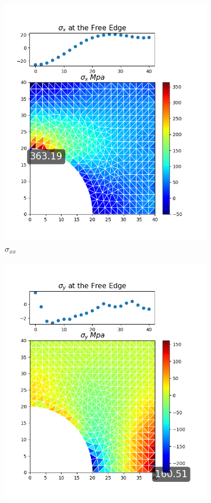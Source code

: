 \documentclass[twoside,twocolumn,10pt]{article}
\begin{document}
\begin{figure}[!ht]
  \begin{subfigure}[c]{0.26\textwidth}
    \includegraphics[width=1.\linewidth]{Q2_5/Q5_1_x_triangle.png}
    \caption{$\sigma_{xx}$}
    \label{fig:x_tri_1}
  \end{subfigure}%
  \begin{subfigure}[c]{0.26\textwidth}
    \includegraphics[width=1.\linewidth]{Q2_5/Q5_1_y_triangle.png}

\end{subfigure}
\end{figure}
\end{document}
